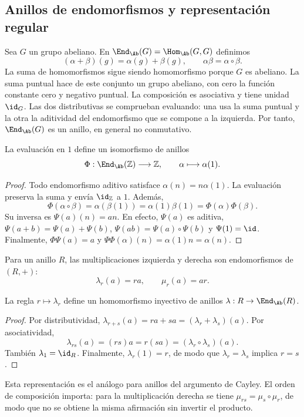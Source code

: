 \subsection{Anillos de endomorfismos y representación regular}
Sea $G$ un grupo abeliano. En $\End_{\Ab}(G)=\Hom_{\Ab}(G,G)$ definimos
\[
(\alpha+\beta)(g)=\alpha(g)+\beta(g),\qquad
\alpha\beta=\alpha\circ\beta.
\]
La suma de homomorfismos sigue siendo homomorfismo porque $G$ es abeliano. La suma puntual hace de este conjunto un grupo abeliano, con cero la función constante cero y negativo puntual. La composición es asociativa y tiene unidad $\id_G$. Las dos distributivas se comprueban evaluando: una usa la suma puntual y la otra la aditividad del endomorfismo que se compone a la izquierda. Por tanto, $\End_{\Ab}(G)$ es un anillo, en general no conmutativo.

\begin{samepage}
\begin{prop}\label{prop:C12-endZ}
La evaluación en $1$ define un isomorfismo de anillos
\[
\Phi:\End_{\Ab}(\mathbb Z)\longrightarrow\mathbb Z,
\qquad\alpha\longmapsto\alpha(1).
\]
\end{prop}
\begin{proof}
Todo endomorfismo aditivo satisface $\alpha(n)=n\alpha(1)$. La evaluación preserva la suma y envía $\id_{\mathbb Z}$ a $1$. Además,
\[
\Phi(\alpha\circ\beta)=\alpha(\beta(1))
=\alpha(1)\beta(1)=\Phi(\alpha)\Phi(\beta).
\]
Su inversa es $\Psi(a)(n)=an$. En efecto, $\Psi(a)$ es aditiva, $\Psi(a+b)=\Psi(a)+\Psi(b)$, $\Psi(ab)=\Psi(a)\circ\Psi(b)$ y $\Psi(1)=\id$. Finalmente, $\Phi\Psi(a)=a$ y $\Psi\Phi(\alpha)(n)=\alpha(1)n=\alpha(n)$.
\end{proof}
\end{samepage}

Para un anillo $R$, las multiplicaciones izquierda y derecha son endomorfismos de $(R,+)$:
\[
\lambda_r(a)=ra,\qquad \mu_r(a)=ar.
\]
\begin{prop}\label{prop:C12-regular}
La regla $r\mapsto\lambda_r$ define un homomorfismo inyectivo de anillos $\lambda:R\to\End_{\Ab}(R)$.
\end{prop}
\begin{proof}
Por distributividad, $\lambda_{r+s}(a)=ra+sa=(\lambda_r+\lambda_s)(a)$. Por asociatividad,
\[
\lambda_{rs}(a)=(rs)a=r(sa)=(\lambda_r\circ\lambda_s)(a).
\]
También $\lambda_1=\id_R$. Finalmente, $\lambda_r(1)=r$, de modo que $\lambda_r=\lambda_s$ implica $r=s$.
\end{proof}
Esta representación es el análogo para anillos del argumento de Cayley. El orden de composición importa: para la multiplicación derecha se tiene $\mu_{rs}=\mu_s\circ\mu_r$, de modo que no se obtiene la misma afirmación sin invertir el producto.

